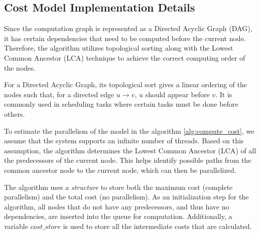 \documentclass[12pt,a4paper,twoside,openright,bibliography=totocnumbered]{report}
\begin{document}
\subsection{Cost Model Implementation Details}
Since the computation graph is represented as a Directed Acyclic Graph (DAG), it has certain dependencies that need to be computed before the current node. Therefore, the algorithm utilizes topological sorting along with the Lowest Common Ancestor (LCA) technique to achieve the correct computing order of the nodes.

For a Directed Acyclic Graph, its topological sort gives a linear ordering of the nodes such that, for a directed edge $u \rightarrow v$, $u$ should appear before $v$. It is commonly used in scheduling tasks where certain tasks must be done before others. 

To estimate the parallelism of the model in the algorithm \ref{alg:compute_cost}, we assume that the system supports an infinite number of threads. Based on this assumption, the algorithm determines the Lowest Common Ancestor (LCA) of all the predecessors of the current node. This helps identify possible paths from the common ancestor node to the current node, which can then be parallelized.

The algorithm uses a \textit{structure} to store both the maximum cost (complete parallelism) and the total cost (no parallelism). As an initialization step for the algorithm, all nodes that do not have any predecessors, and thus have no dependencies, are inserted into the queue for computation. Additionally, a variable $cost\_store$ is used to store all the intermediate costs that are calculated.
\end{document}
